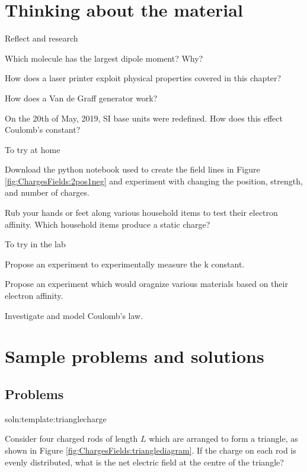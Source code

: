 \newpage
\section{Thinking about the material}

\begin{chapteractivity}{Reflect and research}
{
\item Which molecule has the largest dipole moment? Why?
\item How does a laser printer exploit physical properties covered in this chapter?
\item How does a Van de Graff generator work?
\item On the 20th of May, 2019, SI base units were redefined. How does this effect Coulomb's constant?
}
\end{chapteractivity}

\begin{chapteractivity}{To try at home}
{
\item Download the python notebook used to create the field lines in Figure \ref{fig:ChargesFields:2pos1neg} and experiment with changing the position, strength, and number of charges.
\item Rub your hands or feet along various household items to test their electron affinity. Which household items produce a static charge?
}
\end{chapteractivity}

\begin{chapteractivity}{To try in the lab}
{
\item Propose an experiment to experimentally measure the k constant.
\item Propose an experiment which would oragnize various materials based on their electron affinity.
\item Investigate and model Coulomb's law.
}
\end{chapteractivity}

\newpage
\section{Sample problems and solutions}





\subsection{Problems}
\begin{problem}{soln:template:trianglecharge}{\label{prob:template:trianglecharge} 
Consider four charged rods of length $L$ which are arranged to form a triangle, as shown in Figure \ref{fig:ChargesFields:trianglediagram}. If the charge on each rod is evenly distributed, what is the net electric field at the centre of the triangle?

}
\end{problem}

